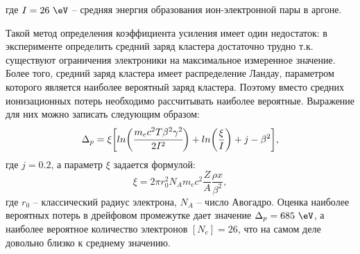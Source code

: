 где $I = 26~\eV$ -- средняя энергия образования ион-электронной пары в аргоне. 
\par Такой метод определения коэффициента усиления имеет один недостаток: в эксперименте определить средний заряд кластера достаточно трудно т.к. существуют ограничения электроники на максимальное измеренное значение. Более того, средний заряд кластера имеет распределение Ландау, параметром которого является наиболее вероятный заряд кластера. Поэтому вместо средних ионизационных потерь необходимо рассчитывать наиболее вероятные. Выражение для них можно записать следующим образом:
\begin{equation}
\Delta_p = \xi\biggl[ln \bigg(\cfrac{ m_ec^2T\beta^2\gamma^2}{2I^2}\bigg) + ln\bigg(\frac{\xi}{I}\bigg) + j - \beta^2 \biggr],
\label{eq:MP_energy_loss}
\end{equation}
где $j=0.2$, а параметр $\xi$ задается формулой:
\begin{equation}
\xi = 2\pi r_0^2 N_A m_ec^2\frac{Z}{A} \frac{\rho x} {\beta^2}, 
\end{equation}
где $r_0$ -- классический радиус электрона, $N_A$ -- число Авогадро. Оценка наиболее вероятных потерь в дрейфовом промежутке дает значение  $\Delta_p = 685~\eV$, а наиболее вероятное количество электронов $[N_e] = 26$, что на самом деле довольно близко к среднему значению.
